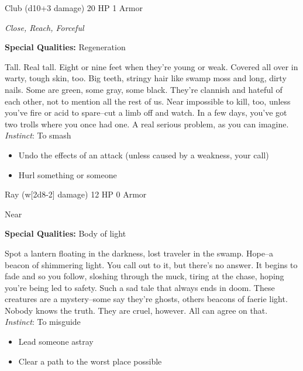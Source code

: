 Club (d10+3 damage)\hspace*{\fill} 20 HP 1 Armor

\emph{Close, Reach, Forceful}

\textbf{Special Qualities:}
Regeneration

\HRule
Tall. Real tall. Eight or nine feet when they're young or weak. Covered all over in warty, tough skin, too. Big teeth, stringy hair like swamp moss and long, dirty nails. Some are green, some gray, some black. They're clannish and hateful of each other, not to mention all the rest of us. Near impossible to kill, too, unless you've fire or acid to spare--cut a limb off and watch. In a few days, you've got two trolls where you once had one. A real serious problem, as you can imagine. \emph{Instinct}: To smash
\begin{itemize}
\item Undo the effects of an attack (unless caused by a weakness, your call)
\item Hurl something or someone
\end{itemize}

\HRule
{}

Ray (w[2d8-2] damage)\hspace*{\fill} 12 HP 0 Armor

Near

\textbf{Special Qualities:}
Body of light

\HRule
Spot a lantern floating in the darkness, lost traveler in the swamp. Hope--a beacon of shimmering light. You call out to it, but there's no answer. It begins to fade and so you follow, sloshing through the muck, tiring at the chase, hoping you're being led to safety. Such a sad tale that always ends in doom. These creatures are a mystery--some say they're ghosts, others beacons of faerie light. Nobody knows the truth. They are cruel, however. All can agree on that. \emph{Instinct}: To misguide
\begin{itemize}
\item Lead someone astray
\item Clear a path to the worst place possible
\end{itemize}
